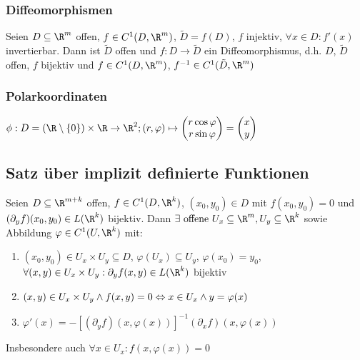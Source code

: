 \subsubsection*{Diffeomorphismen}

Seien $D \subseteq \R^m$ offen, $f \in C^1(D, \R^m)$, $\tilde D = f(D)$, $f$ injektiv, $\forall x \in D: f'(x)$ invertierbar. Dann ist $\tilde D$ offen und $f : D \rightarrow \tilde D$ ein Diffeomorphismus, d.h. $D$, $\tilde D$ offen, $f$ bijektiv und $f \in C^1(D, \R^m)$, $f^{-1} \in C^1(\tilde D, \R^m)$

\subsubsection*{Polarkoordinaten}

$\phi : D = (\R \setminus \{0\}) \times \R \rightarrow \R^2; (r, \varphi) \mapsto \begin{pmatrix} r \cos \varphi \\ r \sin \varphi \end{pmatrix} = \begin{pmatrix} x \\ y \end{pmatrix}$

\subsection*{Satz über implizit definierte Funktionen}

Seien $D \subseteq \R^{m+k}$ offen, $f \in C^1(D, \R^k)$, $(x_0, y_0) \in D$ mit $f(x_0, y_0) = 0$ und $(\partial_y f)(x_0, y_0) \in L(\R^k)$ bijektiv. Dann $\exists \text{ offene } U_x \subseteq \R^m, U_y \subseteq \R^k$ sowie Abbildung $\varphi \in C^1(U, \R^k)$ mit:

\begin{enumerate}[label=(\alph*)]
	\item $(x_0, y_0) \in U_x \times U_y \subseteq D$, $\varphi(U_x) \subseteq U_y$, $\varphi(x_0)=y_0$, $\forall (x, y) \in U_x \times U_y : \partial_y f(x,y) \in L(\R^k)$ bijektiv
	\item $(x, y) \in U_x \times U_y \land f(x,y)=0 \\ \Leftrightarrow x \in U_x \land y=\varphi(x)$
	\item $\varphi'(x) = -[(\partial_y f)(x, \varphi(x))]^{-1}(\partial_x f)(x, \varphi(x))$
\end{enumerate}

Insbesondere auch $\forall x \in U_x : f(x, \varphi(x))=0$

